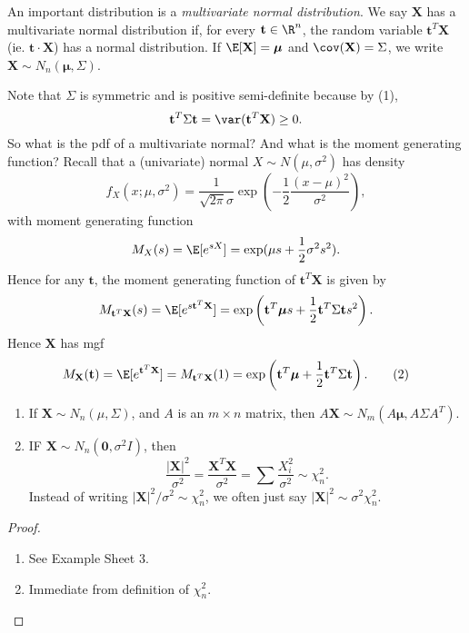 \documentclass[a4paper]{article}
\begin{document}
An important distribution is a \emph{multivariate normal distribution}. We say $\mathbf{X}$ has a multivariate normal distribution if, for every $\mathbf{t}\in \R^n$, the random variable $\mathbf{t}^T\mathbf{X}$ (ie. $\mathbf{t}\cdot \mathbf{X}$) has a normal distribution. If $\E[\mathbf{X}] = \boldsymbol\mu$ and $\cov (\mathbf{X}) = \Sigma$, we write $\mathbf{X}\sim N_n(\boldsymbol\mu, \Sigma)$.

Note that $\Sigma$ is symmetric and is positive semi-definite because by (1),
\[
  \mathbf{t}^T\Sigma \mathbf{t} = \var(\mathbf{t}^T\mathbf{X}) \geq 0.
\]
So what is the pdf of a multivariate normal? And what is the moment generating function? Recall that a (univariate) normal $X\sim N(\mu, \sigma^2)$ has density
\[
  f_X(x; \mu, \sigma^2) = \frac{1}{\sqrt{2\pi}\sigma} \exp\left(-\frac{1}{2}\frac{(x - \mu)^2}{\sigma^2}\right),
\]
with moment generating function
\[
  M_X(s) = \E[e^{sX}] = \exp(\mu s + \frac{1}{2}\sigma^2 s^2).
\]
Hence for any $\mathbf{t}$, the moment generating function of $\mathbf{t}^T\mathbf{X}$ is given by
\[
  M_{\mathbf{t}^T \mathbf{X}}(s) = \E[e^{s\mathbf{t}^T\mathbf{X}}] = \exp\left(\mathbf{t}^T\boldsymbol\mu s + \frac{1}{2}\mathbf{t}^T\Sigma \mathbf{t}s^2\right).
\]
Hence $\mathbf{X}$ has mgf
\[
  M_\mathbf{X}(\mathbf{t}) = \E[e^{\mathbf{t}^T \mathbf{X}}]= M_{\mathbf{t}^T\mathbf{X}}(1) = \exp\left(\mathbf{t}^T\boldsymbol\mu + \frac{1}{2}\mathbf{t}^T \Sigma \mathbf{t}\right).\tag{2}
\]

\begin{prop}\leavevmode
  \begin{enumerate}
    \item If $\mathbf{X} \sim N_n(\mu, \Sigma)$, and $A$ is an $m\times n$ matrix, then $A\mathbf{X} \sim N_m (A\boldsymbol\mu, A\Sigma A^T)$.
    \item IF $\mathbf{X}\sim N_n(\mathbf{0}, \sigma^2 I)$, then
      \[
        \frac{|\mathbf{X}|^2}{\sigma^2} = \frac{\mathbf{X}^T\mathbf{X}}{\sigma^2} = \sum \frac{X_i^2}{\sigma ^2}\sim \chi_n^2.
      \]
      Instead of writing $|\mathbf{X}|^2/\sigma^2 \sim \chi_n^2$, we often just say $|\mathbf{X}|^2 \sim \sigma^2 \chi_n^2$.
  \end{enumerate}
\end{prop}

\begin{proof}\leavevmode
  \begin{enumerate}
    \item See Example Sheet 3.
    \item Immediate from definition of $\chi_n^2$.
  \end{enumerate}
\end{proof}
\end{document}

